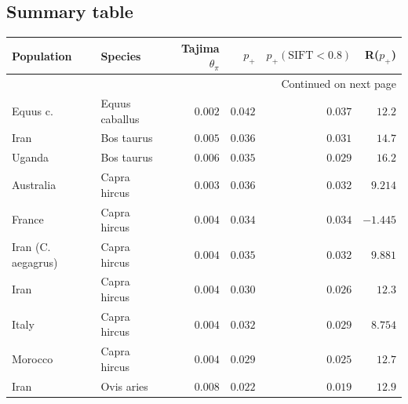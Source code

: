 \documentclass{article}
\begin{document}
    \subsection{Summary table}\label{subsec:summary-table-sift-scores}
    \begin{center}
        \footnotesize
        \begin{longtable}{|l|l|r|r|r|r|}
            \toprule
            Population           & Species             & Tajima $\theta_{\pi}$ & $p_+$    & $p_+ (\textrm{SIFT} < 0.8)$ & R($p_+$) \\
            \midrule
            \endhead
            \midrule
            \multicolumn{6}{r}{{Continued on next page}} \\
            \midrule
            \endfoot

            \bottomrule
            \endlastfoot
            Equus c.             & Equus caballus      & $ 0.002$              & $ 0.042$ & $ 0.037$                    & $  12.2$   \\
            Iran                 & Bos taurus          & $ 0.005$              & $ 0.036$ & $ 0.031$                    & $  14.7$   \\
            Uganda               & Bos taurus          & $ 0.006$              & $ 0.035$ & $ 0.029$                    & $  16.2$   \\
            Australia            & Capra hircus        & $ 0.003$              & $ 0.036$ & $ 0.032$                    & $ 9.214$ \\
            France               & Capra hircus        & $ 0.004$              & $ 0.034$ & $ 0.034$                    & $-1.445$ \\
            Iran (C. aegagrus)   & Capra hircus        & $ 0.004$              & $ 0.035$ & $ 0.032$                    & $ 9.881$ \\
            Iran                 & Capra hircus        & $ 0.004$              & $ 0.030$ & $ 0.026$                    & $  12.3$   \\
            Italy                & Capra hircus        & $ 0.004$              & $ 0.032$ & $ 0.029$                    & $ 8.754$ \\
            Morocco              & Capra hircus        & $ 0.004$              & $ 0.029$ & $ 0.025$                    & $  12.7$   \\
            Iran                 & Ovis aries          & $ 0.008$              & $ 0.022$ & $ 0.019$                    & $  12.9$   \\

\end{longtable}
\end{center}
\end{document}
